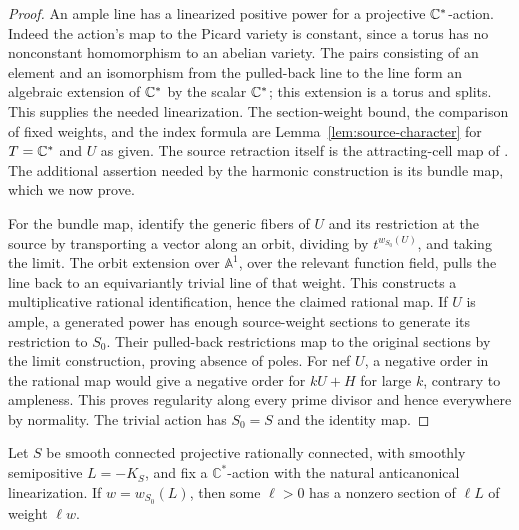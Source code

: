 \begin{proof}
An ample line has a linearized positive power for a projective $\mathbb C^*$-action. Indeed the action's map to the Picard variety is constant, since a torus has no nonconstant homomorphism to an abelian variety. The pairs consisting of an element and an isomorphism from the pulled-back line to the line form an algebraic extension of $\mathbb C^*$ by the scalar $\mathbb C^*$; this extension is a torus and splits. This supplies the needed linearization. The section-weight bound, the comparison of fixed weights, and the index formula are Lemma~\ref{lem:source-character} for $T=\mathbb C^*$ and $U$ as given. The source retraction itself is the attracting-cell map of \cite{BB1973}. The additional assertion needed by the harmonic construction is its bundle map, which we now prove.

For the bundle map, identify the generic fibers of \(U\) and its
restriction at the source by transporting a vector along an orbit,
dividing by \(t^{w_{S_0}(U)}\), and taking the limit. The orbit
extension over \(\mathbb A^1\), over the relevant function field,
pulls the line back to an equivariantly trivial line of that weight.
This constructs a multiplicative rational identification, hence the
claimed rational map. If \(U\) is ample, a generated power has enough
source-weight sections to generate its restriction to \(S_0\). Their
pulled-back restrictions map to the original sections by the limit
construction, proving absence of poles. For nef \(U\), a negative
order in the rational map would give a negative order for
\(kU+H\) for large \(k\), contrary to ampleness. This proves regularity
along every prime divisor and hence everywhere by normality. The
trivial action has \(S_0=S\) and the identity map.
\end{proof}

\begin{proposition}\label{har:prop:extremal}
Let \(S\) be smooth connected projective rationally connected, with
smoothly semipositive \(L=-K_S\), and fix a \(\mathbb C^*\)-action with
the natural anticanonical linearization. If \(w=w_{S_0}(L)\), then
some \(\ell>0\) has a nonzero section of \(\ell L\) of weight \(\ell w\).
\end{proposition}


